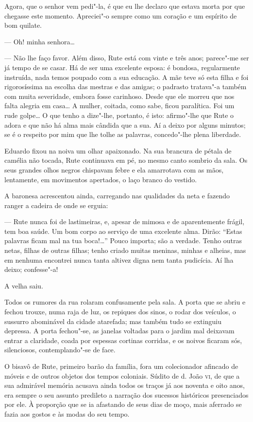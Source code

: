 Agora, que o senhor vem pedi"-la, é que eu lhe declaro que estava morta
por que chegasse este momento. Apreciei"-o sempre como um coração e um
espírito de bom quilate.

--- Oh! minha senhora\ldots{}

--- Não lhe faço favor. Além disso, Rute está com vinte e três anos;
parece"-me ser já tempo de se casar. Há de ser uma excelente esposa: é
bondosa, regularmente instruída, nada temos poupado com a sua educação.
A mãe teve só esta filha e foi rigorosíssima na escolha das mestras e
das amigas; o padrasto tratava"-a também com muita severidade, embora
fosse carinhoso. Desde que ele morreu que nos falta alegria em casa\ldots{} A
mulher, coitada, como sabe, ficou paralítica. Foi um rude golpe\ldots{} O que
tenho a dize"-lhe, portanto, é isto: afirmo"-lhe que Rute o adora e que
não há alma mais cândida que a sua. Aí a deixo por alguns minutos; se é
o respeito por mim que lhe tolhe as palavras, concedo"-lhe plena
liberdade.

Eduardo fixou na noiva um olhar apaixonado. Na sua brancura de pétala de
camélia não tocada, Rute continuava em pé, no mesmo canto sombrio da
sala. Os seus grandes olhos negros chispavam febre e ela amarrotava com
as mãos, lentamente, em movimentos apertados, o laço branco do vestido.

A baronesa acrescentou ainda, carregando nas qualidades da neta e
fazendo ranger a cadeira de onde se erguia:

--- Rute nunca foi de lastimeiras, e, apesar de mimosa e de aparentemente
frágil, tem boa saúde. Um bom corpo ao serviço de uma excelente alma.
Dirão: ``Estas palavras ficam mal na tua boca!\ldots{}'' Pouco importa; são a
verdade. Tenho outras netas, filhas de outras filhas; tenho criado
muitas meninas, minhas e alheias, mas em nenhuma encontrei nunca tanta
altivez digna nem tanta pudicícia. Aí lha deixo; confesse"-a!

A velha saiu.

Todos os rumores da rua rolaram confusamente pela sala. A porta que se
abriu e fechou trouxe, numa raja de luz, os repiques dos sinos, o rodar
dos veículos, o sussurro abominável da cidade atarefada; mas também tudo
se extinguiu depressa. A porta fechou"-se, as janelas voltadas para o
jardim mal deixavam entrar a claridade, coada por espessas cortinas
corridas, e os noivos ficaram sós, silenciosos, contemplando"-se de face.

\asterisc

O bisavô de Rute, primeiro barão da família, fora um colecionador
afincado de móveis e de outros objetos dos tempos coloniais. Súdito de
d. João \textsc{vi}, de que a sua admirável memória acusava ainda todos os traços
já aos noventa e oito anos, era sempre o seu assunto predileto a
narração dos sucessos históricos presenciados por ele. À proporção que
se ia afastando de seus dias de moço, mais aferrado se fazia aos gostos
e às modas do seu tempo.

